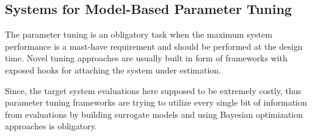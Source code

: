 \subsection{Systems for Model-Based Parameter Tuning}\label{bg: parameter tuning expamples}
The parameter tuning is an obligatory task when the maximum system performance is a mast-have requirement and should be performed at the design time.
Novel tuning approaches are usually built in form of frameworks with exposed hooks for attaching the system under estimation.

Since, the target system evaluations here supposed to be extremely costly, thus parameter tuning frameworks are trying to utilize every single bit of information from evaluations by building surrogate models and using Bayesian optimization approaches is obligatory.

